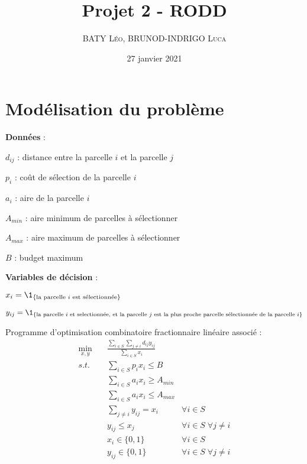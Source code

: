 \documentclass[12pt]{article}
\title{Projet 2 -  RODD}
\date{27 janvier 2021}
\author{\textsc{BATY Léo}, \textsc{BRUNOD-INDRIGO Luca}}
\begin{document}
\maketitle

\section{Modélisation du problème}

\begin{arrowlist}
    \item \textbf{Données} :
    \begin{bulletlist}
        \item $d_{ij}$ : distance entre la parcelle $i$ et la parcelle $j$
        \item $p_i$ : coût de sélection de la parcelle $i$
        \item $a_i$ : aire de la parcelle $i$
        \item $A_{min}$ : aire minimum de parcelles à sélectionner
        \item $A_{max}$ : aire maximum de parcelles à sélectionner
        \item $B$ : budget maximum
    \end{bulletlist}
    \item \textbf{Variables de décision} :
    \begin{bulletlist}
        \item $x_i = \1_{\{ \text{la parcelle $i$ est sélectionnée} \}}$
        \item $y_{ij} = \1_{\{\text{la parcelle $i$ et selectionnée, et la parcelle $j$ est la plus proche parcelle sélectionnée de la parcelle $i$} \}}$
    \end{bulletlist}
    \item Programme d’optimisation combinatoire fractionnaire linéaire associé :
    \begin{align*}
        \min_{x, y} &\quad\frac{\sum_{i \in S} \sum_{j \neq i} d_{ij} y_{ij}}{\sum_{i \in S} x_i} &\\
        s.t.   &\quad \sum_{i \in S} p_i x_i \leq B\\
               &\quad \sum_{i \in S} a_i x_i \geq A_{min}\\
               &\quad \sum_{i \in S} a_i x_i \leq A_{max}\\
               &\quad \sum_{j \neq i} y_{ij} = x_i   & \forall i \in S\\
               &\quad y_{ij} \leq x_j                & \forall i \in S \; \forall j \neq i\\
               &\quad x_i \in \{0, 1\}   & \forall i \in S\\
               &\quad y_{ij} \in \{0, 1\}   & \forall i \in S \; \forall j \neq i
    \end{align*}
\end{arrowlist}
\end{document}
